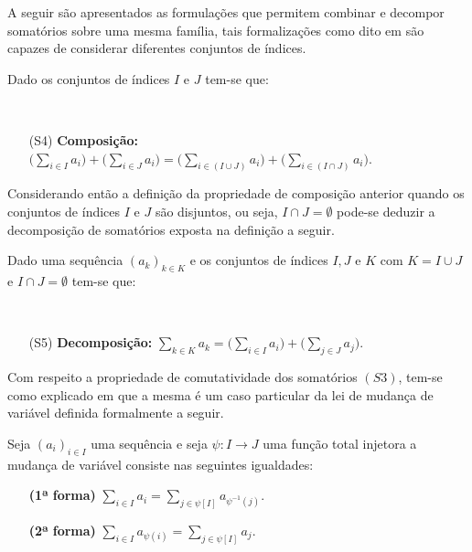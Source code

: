 A seguir são apresentados as formulações que permitem combinar e decompor somatórios sobre uma mesma família, tais formalizações como dito em \cite{carmo2013} são capazes de considerar diferentes conjuntos de índices.

\begin{definition}[Composição]
	\cite{carmo2013} Dado os conjuntos de índices $I$ e $J$ tem-se que:
	
	\
	
	\begin{itemize}
		\item[(S4)] \textbf{Composição:} $\displaystyle \Big(\sum_{i \in I} a_i\Big) + \Big(\sum_{i \in J} a_i\Big) = \Big(\sum_{i \in (I \cup J)} a_i\Big) + \Big(\sum_{i \in (I \cap J)} a_i\Big)$.
	\end{itemize}
\end{definition}


Considerando então a definição da propriedade de composição anterior quando os conjuntos de índices $I$ e $J$ são disjuntos, ou seja, $I \cap J = \emptyset$ pode-se deduzir a decomposição de somatórios exposta na definição a seguir. 

\begin{definition}[Decomposição]
	\cite{carmo2013} Dado uma sequência $(a_k)_{k \in K}$ e os conjuntos de índices $I, J$ e $K$ com $K = I \cup J$ e $I \cap J = \emptyset$ tem-se que:
	
	\
	
	\begin{itemize}
		\item[(S5)] \textbf{Decomposição:} $\displaystyle \sum_{k \in K} a_k = \Big(\sum_{i \in I} a_i\Big) + \Big(\sum_{j \in J} a_j\Big)$.
	\end{itemize}
\end{definition}

Com respeito a propriedade de comutatividade dos somatórios $(S3)$, tem-se como explicado em \cite{carmo2013} que a mesma é um caso particular da lei de mudança de variável \cite{carmo2013} definida formalmente a seguir.

\begin{definition}
	Seja $(a_i)_{i \in I}$ uma sequência e seja $\psi: I \rightarrow J$ uma função total injetora a mudança de variável consiste nas seguintes igualdades:
	
	\begin{itemize}
		\item[\textbf{(1ª}] \textbf{forma)} $\displaystyle \sum_{i \in I} a_i = \sum_{j \in \psi[I]} a_{\psi^{-1}(j)}$.
		\item[\textbf{(2ª}] \textbf{forma)} $\displaystyle \sum_{i \in I} a_{\psi(i)} = \sum_{j \in \psi[I]} a_j$.
	\end{itemize}
\end{definition}


